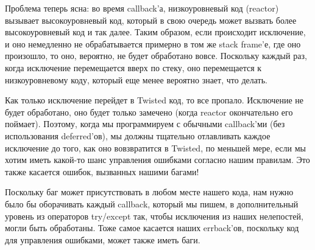 Проблема теперь ясна: во время callback'а, низкоуровневый код (reactor) 
вызывает высокоуровневый код, который в свою очередь может вызвать более 
высокоуровневый код и так далее. Таким образом, если происходит исключение, и 
оно немедленно не обрабатывается примерно в том же stack frame'е, где оно 
произошло, то оно, вероятно, не будет обработано вовсе. Поскольку каждый раз, 
когда исключение перемещается вверх по стеку, оно перемещается к низкоуровневому 
коду, который еще менее вероятно знает, что делать.


Как только исключение перейдет в Twisted код, то все пропало. 
Исключение не будет обработано, оно будет только замечено (когда reactor 
окончательно его поймает). Поэтому, когда мы программируем с обычными 
callback'ми (без использования deferred'ов), мы должны тщательно 
отлавливать каждое исключение до того, как оно вовзвратится в 
Twisted, по меньшей мере, если мы хотим иметь какой-то шанс управления 
ошибками согласно нашим правилам. Это также касается ошибок, вызванных  
нашими багами!


Поскольку баг может присутствовать в любом месте нашего кода, нам нужно было 
бы оборачивать каждый callback, который мы пишем, в дополнительный уровень 
из операторов try/except так, чтобы исключения из наших нелепостей, могли 
быть обработаны.  Тоже самое касается наших errback'ов, поскольку код для 
управления ошибками, может также иметь баги. 


